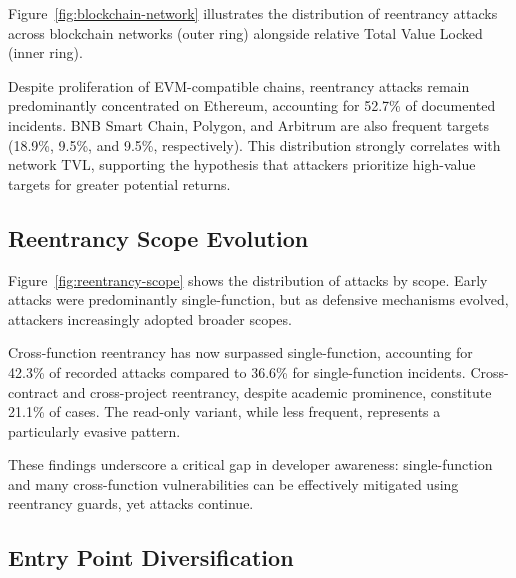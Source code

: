 Figure~\ref{fig:blockchain-network} illustrates the distribution of reentrancy attacks across blockchain networks (outer ring) alongside relative Total Value Locked (inner ring).

Despite proliferation of EVM-compatible chains, reentrancy attacks remain predominantly concentrated on Ethereum, accounting for 52.7\% of documented incidents. BNB Smart Chain, Polygon, and Arbitrum are also frequent targets (18.9\%, 9.5\%, and 9.5\%, respectively). This distribution strongly correlates with network TVL, supporting the hypothesis that attackers prioritize high-value targets for greater potential returns.




\subsection{Reentrancy Scope Evolution}
\label{sec:results-scope}

Figure~\ref{fig:reentrancy-scope} shows the distribution of attacks by scope. Early attacks were predominantly single-function, but as defensive mechanisms evolved, attackers increasingly adopted broader scopes.

Cross-function reentrancy has now surpassed single-function, accounting for 42.3\% of recorded attacks compared to 36.6\% for single-function incidents. Cross-contract and cross-project reentrancy, despite academic prominence, constitute 21.1\% of cases. The read-only variant, while less frequent, represents a particularly evasive pattern.

These findings underscore a critical gap in developer awareness: single-function and many cross-function vulnerabilities can be effectively mitigated using reentrancy guards, yet attacks continue.



\subsection{Entry Point Diversification}
\label{sec:results-entry}

